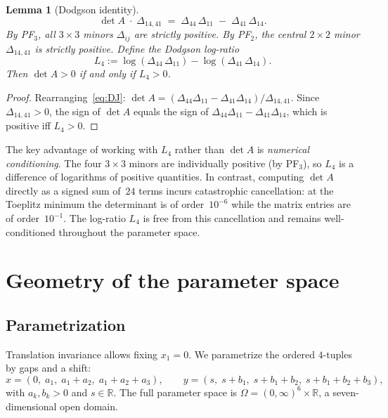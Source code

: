 \documentclass[11pt,a4paper]{amsart}
\newtheorem{lemma}[theorem]{Lemma}
\theoremstyle{definition}
\theoremstyle{remark}
\newcommand{\R}{\mathbb{R}}
\begin{document}
\begin{lemma}[Dodgson identity]\label{lem:dodgson}
\begin{equation}\label{eq:DJ}
  \det A \;\cdot\; \Delta_{14,41}
  \;=\; \Delta_{44}\,\Delta_{11} \;-\; \Delta_{41}\,\Delta_{14}.
\end{equation}
By PF$_3$, all $3\times 3$ minors $\Delta_{ij}$ are strictly positive.
By PF$_2$, the central $2\times 2$ minor $\Delta_{14,41}$ is
strictly positive.
Define the Dodgson log-ratio
\begin{equation}\label{eq:L4}
  L_4 := \log(\Delta_{44}\,\Delta_{11})
       - \log(\Delta_{41}\,\Delta_{14}).
\end{equation}
Then $\det A > 0$ if and only if $L_4 > 0$.
\end{lemma}
\begin{proof}
Rearranging~\eqref{eq:DJ}:
$\det A = (\Delta_{44}\Delta_{11} - \Delta_{41}\Delta_{14})/\Delta_{14,41}$.
Since $\Delta_{14,41} > 0$, the sign of $\det A$ equals the
sign of $\Delta_{44}\Delta_{11} - \Delta_{41}\Delta_{14}$,
which is positive iff $L_4 > 0$.
\end{proof}

The key advantage of working with $L_4$ rather than $\det A$
is \emph{numerical conditioning}.
The four $3\times 3$ minors are individually positive
(by PF$_3$), so $L_4$ is a difference of logarithms of
positive quantities.
In contrast, computing $\det A$ directly as a signed sum
of~$24$ terms incurs catastrophic cancellation:
at the Toeplitz minimum the determinant is of
order~$10^{-6}$ while the matrix entries are of order~$10^{-1}$.
The log-ratio $L_4$ is free from this cancellation and remains
well-conditioned throughout the parameter space.


\section{Geometry of the parameter space}\label{sec:geometry}

\subsection{Parametrization}

Translation invariance allows fixing $x_1 = 0$.
We parametrize the ordered $4$-tuples by gaps and a shift:
\begin{equation}\label{eq:param}
  x = (0,\; a_1,\; a_1{+}a_2,\; a_1{+}a_2{+}a_3), \qquad
  y = (s,\; s{+}b_1,\; s{+}b_1{+}b_2,\; s{+}b_1{+}b_2{+}b_3),
\end{equation}
with $a_k, b_k > 0$ and $s \in \R$.
The full parameter space is
$\Omega = (0,\infty)^6 \times \R$,
a seven-dimensional open domain.
\end{document}
